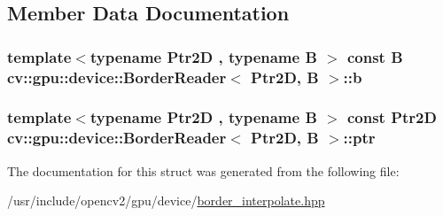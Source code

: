 \subsection{Member Data Documentation}
\hypertarget{structcv_1_1gpu_1_1device_1_1BorderReader_ac633af0935bfd05794a8fe092c475895}{
\subsubsection[{b}]{\setlength{\rightskip}{0pt plus 5cm}template$<$typename Ptr2\-D , typename B $>$ const {\bf B} {\bf cv\-::gpu\-::device\-::\-Border\-Reader}$<$ Ptr2\-D, {\bf B} $>$\-::b}}\label{structcv_1_1gpu_1_1device_1_1BorderReader_ac633af0935bfd05794a8fe092c475895}
\hypertarget{structcv_1_1gpu_1_1device_1_1BorderReader_a7b33c15f65ff4160736d30ad12fc8f3e}{
\subsubsection[{ptr}]{\setlength{\rightskip}{0pt plus 5cm}template$<$typename Ptr2\-D , typename B $>$ const Ptr2\-D {\bf cv\-::gpu\-::device\-::\-Border\-Reader}$<$ Ptr2\-D, {\bf B} $>$\-::ptr}}\label{structcv_1_1gpu_1_1device_1_1BorderReader_a7b33c15f65ff4160736d30ad12fc8f3e}


The documentation for this struct was generated from the following file\-:\begin{DoxyCompactItemize}
\item 
/usr/include/opencv2/gpu/device/\hyperlink{border__interpolate_8hpp}{border\-\_\-interpolate.\-hpp}\end{DoxyCompactItemize}
